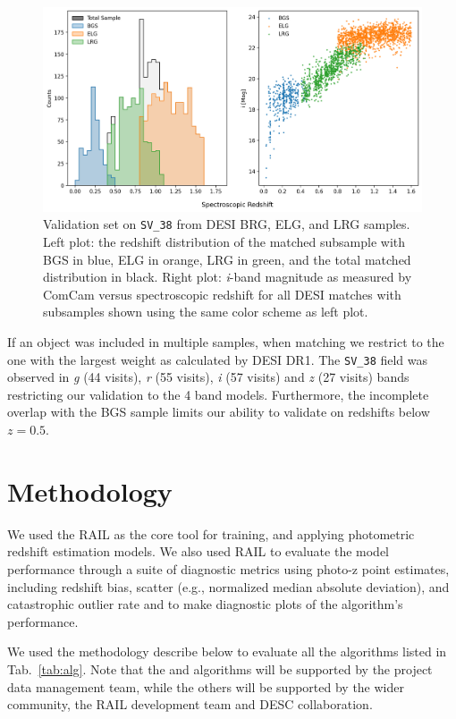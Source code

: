 \begin{figure}
    \centering
    \includegraphics[width=.8\linewidth]{figures/desi_sample_histogram.png}
    \caption{Validation set on \texttt{SV\_38} from DESI BRG, ELG, and LRG samples. Left plot: the redshift distribution of the matched subsample with BGS in blue, ELG in orange, LRG in green, and the total matched distribution in black. Right plot: \textit{i}-band magnitude as measured by ComCam versus spectroscopic redshift for all DESI matches with subsamples shown using the same color scheme as left plot.}
    \label{fig:desi-subsample-hist}
\end{figure}

If an object was included in multiple samples, when matching we restrict to the one with the largest weight as calculated by DESI DR1.
The \texttt{SV\_38} field was observed in \textit{g} (44 visits), \textit{r} (55 visits), \textit{i} (57 visits) and \textit{z} (27 visits) bands restricting our validation to the 4 band models.
Furthermore, the incomplete overlap with the BGS sample limits our ability to validate on redshifts below $z=0.5$. 


\section{Methodology}
\label{sec:method:0}

We used the RAIL as the core tool for training, and applying photometric redshift estimation models.   We also used RAIL to evaluate the model performance through a suite of diagnostic metrics using photo-z point estimates, including redshift bias, scatter (e.g., normalized median absolute deviation), and catastrophic outlier rate and to make diagnostic plots of the algorithm's performance.

We used the methodology describe below to evaluate all the algorithms listed in Tab.~\ref{tab:alg}.  Note that the  and  algorithms will be supported by the project data management team, while the others will be supported by the wider community, the RAIL development team and DESC collaboration.



